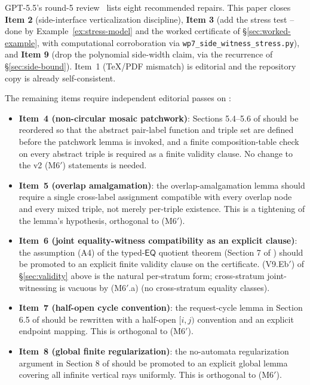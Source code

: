 \documentclass[11pt]{article}
\theoremstyle{definition}
\theoremstyle{remark}
\newcommand{\EQ}{\mathsf{EQ}}
\begin{document}
GPT-5.5's round-5 review~\cite{GPT55Round5Review} lists eight
recommended repairs.  This paper closes \textbf{Item 2} (side-interface
verticalization discipline), \textbf{Item 3} (add the stress test --
done by Example~\ref{ex:stress-model} and the worked certificate of
\S\ref{sec:worked-example}, with computational corroboration via
\texttt{wp7\_side\_witness\_stress.py}), and \textbf{Item 9} (drop the
polynomial side-width claim, via the recurrence of
\S\ref{sec:side-bound}).  Item~1 (TeX/PDF mismatch) is editorial and
the repository copy is already self-consistent.

The remaining items require independent editorial passes on
\cite{GPT55Repaired}:

\begin{itemize}
\item \textbf{Item~4 (non-circular mosaic patchwork)}: Sections 5.4--5.6
  of \cite{GPT55Repaired} should be reordered so that the abstract
  pair-label function and triple set are defined before the
  patchwork lemma is invoked, and a finite composition-table check on
  every abstract triple is required as a finite validity clause.
  No change to the v2 (M6$'$) statements is needed.
\item \textbf{Item~5 (overlap amalgamation)}: the overlap-amalgamation
  lemma should require a single cross-label assignment compatible
  with every overlap node and every mixed triple, not merely
  per-triple existence.  This is a tightening of the lemma's
  hypothesis, orthogonal to (M6$'$).
\item \textbf{Item~6 (joint equality-witness compatibility as an
  explicit clause)}: the assumption (A4) of the typed-$\EQ$ quotient
  theorem (Section 7 of \cite{GPT55Repaired}) should be promoted to
  an explicit finite validity clause on the certificate.  (V9.Eb$'$)
  of \S\ref{sec:validity} above is the natural per-stratum form;\@
  cross-stratum joint-witnessing is vacuous by (M6$'$.a) (no
  cross-stratum equality classes).
\item \textbf{Item~7 (half-open cycle convention)}: the request-cycle
  lemma in Section 6.5 of \cite{GPT55Repaired} should be rewritten
  with a half-open $[i,j)$ convention and an explicit endpoint
  mapping.  This is orthogonal to (M6$'$).
\item \textbf{Item~8 (global finite regularization)}: the
  no-automata regularization argument in Section 8 of
  \cite{GPT55Repaired} should be promoted to an explicit global
  lemma covering all infinite vertical rays uniformly.  This is
  orthogonal to (M6$'$).
\end{itemize}
\end{document}
